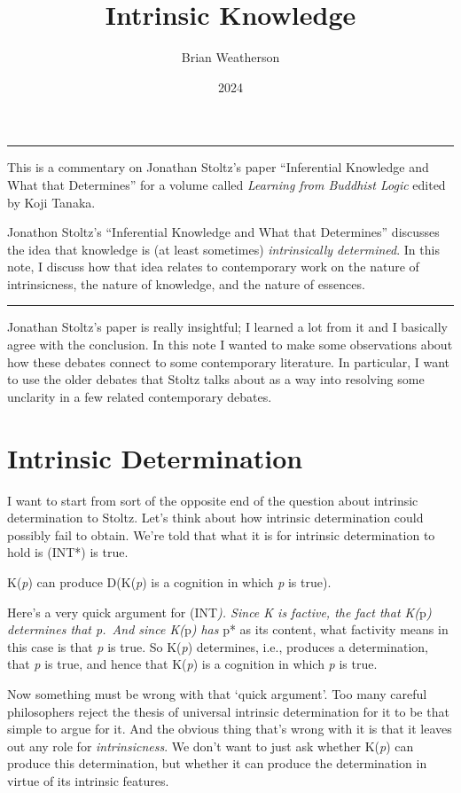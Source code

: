 \documentclass[
  10pt,
  letterpaper,
  DIV=11,
  numbers=noendperiod,
  twoside]{scrartcl}
\title{Intrinsic Knowledge}
\author{Brian Weatherson}
\date{2024}
\providecommand{\tightlist}{%
  \setlength{\itemsep}{0pt}\setlength{\parskip}{0pt}}\usepackage{longtable,booktabs,array}
\renewenvironment{abstract}
 {\vspace{-1.25cm}
 \quotation\small\noindent\rule{\linewidth}{.5pt}\par\smallskip
 \noindent }
 {\par\noindent\rule{\linewidth}{.5pt}\endquotation}
\begin{document}
\maketitle
\begin{abstract}
This is a commentary on Jonathan Stoltz's paper ``Inferential Knowledge
and What that Determines'' for a volume called \emph{Learning from
Buddhist Logic} edited by Koji Tanaka.

Jonathon Stoltz's ``Inferential Knowledge and What that Determines''
discusses the idea that knowledge is (at least sometimes)
\emph{intrinsically determined}. In this note, I discuss how that idea
relates to contemporary work on the nature of intrinsicness, the nature
of knowledge, and the nature of essences.
\end{abstract}


Jonathan Stoltz's paper is really insightful; I learned a lot from it
and I basically agree with the conclusion. In this note I wanted to make
some observations about how these debates connect to some contemporary
literature. In particular, I want to use the older debates that Stoltz
talks about as a way into resolving some unclarity in a few related
contemporary debates.

\section{Intrinsic Determination}\label{sec-intrinsic-determination}

I want to start from sort of the opposite end of the question about
intrinsic determination to Stoltz. Let's think about how intrinsic
determination could possibly fail to obtain. We're told that what it is
for intrinsic determination to hold is (INT*) is true.

\begin{description}
\tightlist
\item[(INT*)]
K(\emph{p}) can produce D(K(\emph{p}) is a cognition in which \emph{p}
is true).
\end{description}

Here's a very quick argument for (INT\emph{). Since K is factive, the
fact that K(}p\emph{) determines that p.~And since K(}p\emph{) has }p*
as its content, what factivity means in this case is that \emph{p} is
true. So K(\emph{p}) determines, i.e., produces a determination, that
\emph{p} is true, and hence that K(\emph{p}) is a cognition in which
\emph{p} is true.

Now something must be wrong with that `quick argument'. Too many careful
philosophers reject the thesis of universal intrinsic determination for
it to be that simple to argue for it. And the obvious thing that's wrong
with it is that it leaves out any role for \emph{intrinsicness}. We
don't want to just ask whether K(\emph{p}) can produce this
determination, but whether it can produce the determination in virtue of
its intrinsic features.
\end{document}
